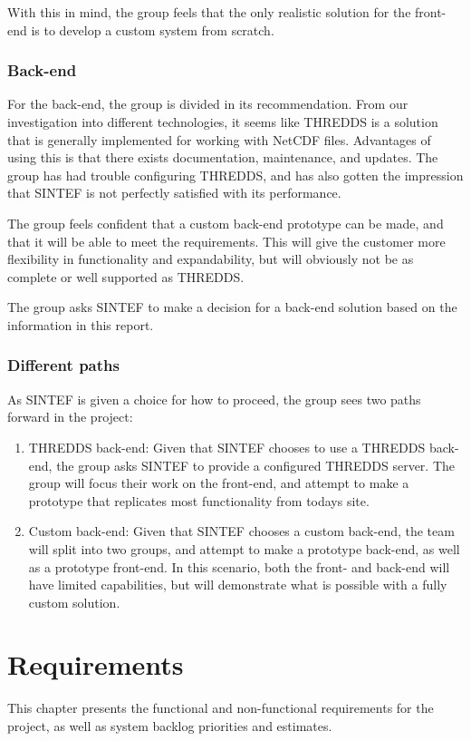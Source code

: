 \documentclass[11pt,a4paper,titlepage,oneside]{report}
\begin{document}
With this in mind, the group feels that the only realistic solution for the front-end is to develop a custom system from scratch.

\subsection{Back-end}
For the back-end, the group is divided in its recommendation. From our investigation into different technologies, it seems like THREDDS is a solution that is generally implemented for working with NetCDF files. Advantages of using this is that there exists documentation, maintenance, and updates. The group has had trouble configuring THREDDS, and has also gotten the impression that SINTEF is not perfectly satisfied with its performance. 

The group feels confident that a custom back-end prototype can be made, and that it will be able to meet the requirements. This will give the customer more flexibility in functionality and expandability, but will obviously not be as complete or well supported as THREDDS.

The group asks SINTEF to make a decision for a back-end solution based on the information in this report.

\subsection{Different paths}
As SINTEF is given a choice for how to proceed, the group sees two paths forward in the project:
\begin{enumerate}
\item THREDDS back-end: Given that SINTEF chooses to use a THREDDS back-end, the group asks SINTEF to provide a configured THREDDS server. The group will focus their work on the front-end, and attempt to make a prototype that replicates most functionality from todays site.
\item Custom back-end: Given that SINTEF chooses a custom back-end, the team will split into two groups, and attempt to make a prototype back-end, as well as a prototype front-end. In this scenario, both the front- and back-end will have limited capabilities, but will demonstrate what is possible with a fully custom solution.
\end{enumerate}


\chapter{Requirements}
This chapter presents the functional and non-functional requirements for the project, as well as system backlog priorities and estimates.
\end{document}
